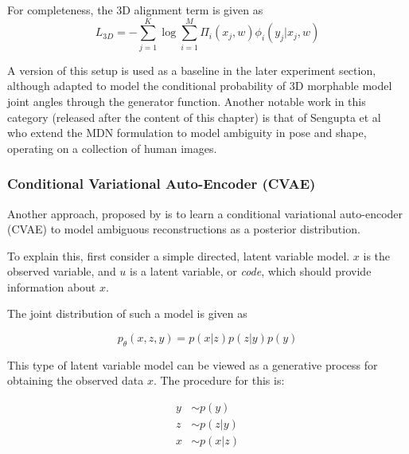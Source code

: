 For completeness, the 3D alignment term is given as
\begin{equation}
  L_{3D} = -\sum_{j=1}^{K} \log \sum_{i=1}^{M} \Pi_{i}(x_{j}, w) \phi_{i}(y_j | x_j, w)
\end{equation}

A version of this setup is used as a baseline in the later experiment section, although adapted to model the conditional probability of 3D morphable model joint angles through the generator function. Another notable work in this category (released after the content of this chapter) is that of Sengupta et al~ who extend the MDN formulation to model ambiguity in pose and shape, operating on a collection of human images. 

\subsubsection{Conditional Variational Auto-Encoder (CVAE)}

Another approach, proposed by \citet{sharma19monocular} is to learn a conditional variational auto-encoder (CVAE) to model ambiguous reconstructions as a posterior distribution. 

To explain this, first consider a simple directed, latent variable model. $x$ is the observed variable, and $u$ is a latent variable, or \emph{code}, which should provide information about $x$.

\begin{center}
\end{center}

The joint distribution of such a model is given as

$$
  p_{\theta}(x,z,y) = p(x|z)p(z|y)p(y)
$$

This type of latent variable model can be viewed as a generative process for obtaining the observed data $x$. The procedure for this is:

$$
\begin{aligned}
  y &\sim p(y) \\
  z &\sim p(z|y) \\
  x &\sim p(x|z)
\end{aligned}
$$

